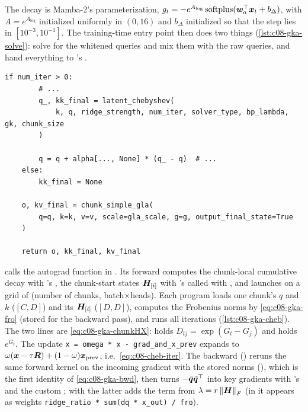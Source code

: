 The decay is Mamba-2's parameterization, $g_t=-e^{A_{\log}}\,\mathrm{softplus}(\bm{w}_a^{\top}\bm{x}_t+b_{\Delta})$,
with $A=e^{A_{\log}}$ initialized uniformly in $(0,16)$ and $b_\Delta$ initialized so that the step
lies in $[10^{-3},10^{-1}]$. The training-time entry point then does two things
(\cref{lst:c08-gka-solve}): solve for the whitened queries and mix them with the raw queries, and
hand everything to \fla's .

\begin{lstlisting}[caption={Excerpt from \texttt{repos/\allowbreak awslabs\_\_hybrid-model-factory/\allowbreak training/\allowbreak src/\allowbreak hmf/\allowbreak model/\allowbreak hybrid\_zoo/\allowbreak layers/\allowbreak gated\_kalmanet/\allowbreak ops/\allowbreak chebyshev/\allowbreak gka\_chebyshev\_solve.py} (function \texttt{gka\_chebyshev\_gla}). Two non-ASCII comments are elided.},label={lst:c08-gka-solve}]
    if num_iter > 0:
        # ...
        q_, kk_final = latent_chebyshev(
            k, q, ridge_strength, num_iter, solver_type, bp_lambda, gk, chunk_size
        )

        q = q + alpha[..., None] * (q_ - q)  # ...
    else:
        kk_final = None

    o, kv_final = chunk_simple_gla(
        q=q, k=k, v=v, scale=gla_scale, g=g, output_final_state=True
    )

    return o, kk_final, kv_final
\end{lstlisting}

\begin{implnote}[title={In the code: the chunked Chebyshev kernel}]
 calls the autograd function  in
.
Its forward computes the chunk-local cumulative decay with \fla's , the
chunk-start states $\bm{H}_{[i]}$ with \fla's  called with , and launches
 on a grid of (number of chunks, batch$\times$heads).
Each program loads one chunk's $q$ and $k$ ($[C,D]$) and its $\bm{H}_{[i]}$ ($[D,D]$), computes the
Frobenius norms by \eqref{eq:c08-gka-fro} (stored for the backward pass), and runs all iterations
(\cref{lst:c08-gka-cheb}). The two  lines are \eqref{eq:c08-gka-chunkHX}: 
holds $D_{tj}=\exp(G_t-G_j)$ and  holds $e^{G_t}$. The update
\texttt{x~=~omega~*~x~-~grad\_and\_x\_prev} expands to
$\omega(\bm{x}-\tau\bm{R})+(1-\omega)\bm{x}_\text{prev}$, i.e.\ \eqref{eq:c08-cheb-iter}. The backward
() reruns the same forward kernel on the incoming gradient with the
stored norms (), which is the first identity of \eqref{eq:c08-gka-bwd}, then turns
$-\bar{\bm{q}}\tilde{\bm{q}}^{\top}$ into key gradients with \fla's  and the custom
; with  the latter adds the term from
$\lambda=r\left\lVert \bm{H}\right\rVert_F$ (in  it appears as weights
\texttt{ridge\_ratio~*~sum(dq~*~x\_out)~/~fro}).
\end{implnote}

